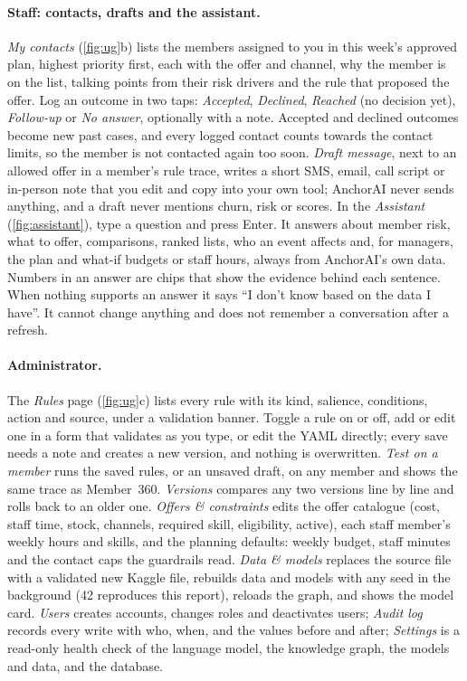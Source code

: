 \documentclass[paper=a4, fontsize=11pt, open=any, parskip=half-,
  headings=small, numbers=noenddot, captions=tableheading, toc=flat]{scrreprt}
\begin{document}
\paragraph{Staff: contacts, drafts and the assistant.} \emph{My contacts} (\cref{fig:ug}b) lists the members assigned to you in this week's approved plan, highest priority first, each with the offer and channel, why the member is on the list, talking points from their risk drivers and the rule that proposed the offer. Log an outcome in two taps: \emph{Accepted}, \emph{Declined}, \emph{Reached} (no decision yet), \emph{Follow-up} or \emph{No answer}, optionally with a note. Accepted and declined outcomes become new past cases, and every logged contact counts towards the contact limits, so the member is not contacted again too soon. \emph{Draft message}, next to an allowed offer in a member's rule trace, writes a short SMS, email, call script or in-person note that you edit and copy into your own tool; AnchorAI never sends anything, and a draft never mentions churn, risk or scores. In the \emph{Assistant} (\cref{fig:assistant}), type a question and press Enter. It answers about member risk, what to offer, comparisons, ranked lists, who an event affects and, for managers, the plan and what-if budgets or staff hours, always from AnchorAI's own data. Numbers in an answer are chips that show the evidence behind each sentence. When nothing supports an answer it says \enquote{I don't know based on the data I have}. It cannot change anything and does not remember a conversation after a refresh.

\paragraph{Administrator.} The \emph{Rules} page (\cref{fig:ug}c) lists every rule with its kind, salience, conditions, action and source, under a validation banner. Toggle a rule on or off, add or edit one in a form that validates as you type, or edit the YAML directly; every save needs a note and creates a new version, and nothing is overwritten. \emph{Test on a member} runs the saved rules, or an unsaved draft, on any member and shows the same trace as Member~360. \emph{Versions} compares any two versions line by line and rolls back to an older one. \emph{Offers \& constraints} edits the offer catalogue (cost, staff time, stock, channels, required skill, eligibility, active), each staff member's weekly hours and skills, and the planning defaults: weekly budget, staff minutes and the contact caps the guardrails read. \emph{Data \& models} replaces the source file with a validated new Kaggle file, rebuilds data and models with any seed in the background (42 reproduces this report), reloads the graph, and shows the model card. \emph{Users} creates accounts, changes roles and deactivates users; \emph{Audit log} records every write with who, when, and the values before and after; \emph{Settings} is a read-only health check of the language model, the knowledge graph, the models and data, and the database.
\end{document}

